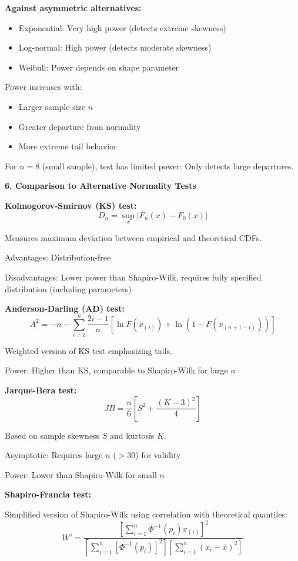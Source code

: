 \documentclass[12pt]{article}
\begin{document}
\begin{explanation}
\textbf{Against asymmetric alternatives:}
\begin{itemize}
\item Exponential: Very high power (detects extreme skewness)
\item Log-normal: High power (detects moderate skewness)
\item Weibull: Power depends on shape parameter
\end{itemize}

Power increases with:
\begin{itemize}
\item Larger sample size $n$
\item Greater departure from normality
\item More extreme tail behavior
\end{itemize}

For $n=8$ (small sample), test has limited power: Only detects large departures.

\textbf{6. Comparison to Alternative Normality Tests}

\textbf{Kolmogorov-Smirnov (KS) test:}
\[D_n = \sup_x |F_n(x) - F_0(x)|\]

Measures maximum deviation between empirical and theoretical CDFs.

Advantages: Distribution-free

Disadvantages: Lower power than Shapiro-Wilk, requires fully specified distribution (including parameters)

\textbf{Anderson-Darling (AD) test:}
\[A^2 = -n - \sum_{i=1}^{n} \frac{2i-1}{n}[\ln F(x_{(i)}) + \ln(1 - F(x_{(n+1-i)}))]\]

Weighted version of KS test emphasizing tails.

Power: Higher than KS, comparable to Shapiro-Wilk for large $n$

\textbf{Jarque-Bera test:}
\[JB = \frac{n}{6}\left[S^2 + \frac{(K-3)^2}{4}\right]\]

Based on sample skewness $S$ and kurtosis $K$.

Asymptotic: Requires large $n$ ($> 30$) for validity

Power: Lower than Shapiro-Wilk for small $n$

\textbf{Shapiro-Francia test:}

Simplified version of Shapiro-Wilk using correlation with theoretical quantiles:
\[W' = \frac{[\sum_{i=1}^{n} \Phi^{-1}(p_i) x_{(i)}]^2}{[\sum_{i=1}^{n} [\Phi^{-1}(p_i)]^2][\sum_{i=1}^{n} (x_i - \bar{x})^2]}\]


\end{explanation}
\end{document}
